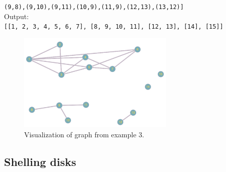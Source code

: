 \documentclass[a4paper,11pt]{article}
\begin{document}
\texttt{(9,8),(9,10),(9,11),(10,9),(11,9),(12,13),(13,12)]}
\\
Output: \\
\texttt{[[1, 2, 3, 4, 5, 6, 7], [8, 9, 10, 11], [12, 13], [14], [15]]}
\begin{figure}[ht!]
    \centering
    \includegraphics[width=75mm]{example3.png}
    \caption{Visualization of graph from example 3.}
\end{figure}

\subsection{Shelling disks}
\end{document}
